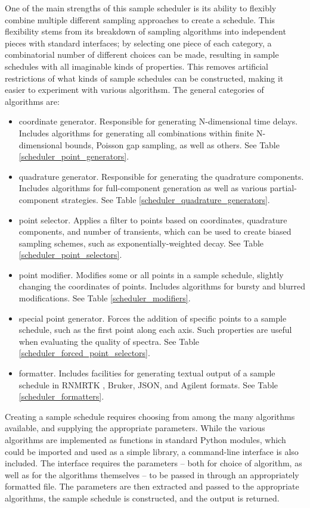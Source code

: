 One of the main strengths of this sample scheduler is its ability to flexibly
combine multiple different sampling approaches to create a schedule.  This
flexibility stems from its breakdown of sampling algorithms into independent
pieces with standard interfaces; by selecting one piece of each category, 
a combinatorial number of different choices can be made, resulting in sample
schedules with all imaginable kinds of properties.  This removes artificial
restrictions of what kinds of sample schedules can be constructed, making it
easier to experiment with various algorithsm.  The general categories of 
algorithms are:
\begin{itemize}
  \item coordinate generator.  Responsible for generating N-dimensional time
    delays.  Includes algorithms for generating all combinations within finite
    N-dimensional bounds, Poisson gap \cite{poissongap} sampling, as well
    as others.  See Table \ref{scheduler_point_generators}.
  \item quadrature generator.  Responsible for generating the quadrature
    components.  Includes algorithms for full-component generation as well
    as various partial-component strategies.
    See Table \ref{scheduler_quadrature_generators}.
  \item point selector.  Applies a filter to points based on coordinates,
    quadrature components, and number of transients, which can be used to create
    biased sampling schemes, such as exponentially-weighted decay.
    See Table \ref{scheduler_point_selectors}.
  \item point modifier.  Modifies some or all points in a sample schedule, 
    slightly changing the coordinates of points.  Includes algorithms for
    bursty \cite{maciejewski2009nonuniform} and blurred 
    \cite{hoch2008randomization} modifications.
    See Table \ref{scheduler_modifiers}.
  \item special point generator.  Forces the addition of specific points to
    a sample schedule, such as the first point along each axis.  Such properties
    are useful when evaluating the quality of spectra.
    See Table \ref{scheduler_forced_point_selectors}.
  \item formatter.  Includes facilities for generating textual output of a 
    sample schedule in RNMRTK \cite{rnmrtk}, Bruker, JSON, and Agilent formats.
    See Table \ref{scheduler_formatters}.
\end{itemize}
Creating a sample schedule requires choosing from among the many algorithms 
available, and supplying the appropriate parameters.  While the various algorithms
are implemented as functions in standard Python modules, which could be imported
and used as a simple library, a command-line interface is also included.  The
interface requires the parameters -- both for choice of algorithm, as well as
for the algorithms themselves -- to be passed in through an appropriately
formatted file.  The parameters are then extracted and passed to the appropriate
algorithms, the sample schedule is constructed, and the output is returned. 

